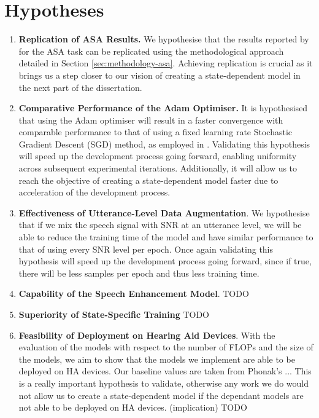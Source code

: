 \documentclass[logo,bsc,singlespacing,parskip,online]{infthesis}
\begin{document}
\section{Hypotheses}
\label{sec:hypotheses}
\begin{enumerate}
   \item \textbf{Replication of ASA Results.} 
   We hypothesise that the results reported by \citet{Huwel2020HearDS} for the ASA task can be replicated using the methodological approach detailed in Section \ref{sec:methodology-asa}.
   Achieving replication is crucial as it brings us a step closer to our vision of creating a state-dependent model in the next part of the dissertation.
   \item \textbf{Comparative Performance of the Adam Optimiser.}
   It is hypothesised that using the Adam optimiser will result in a faster convergence with comparable performance to that of using a fixed learning rate Stochastic Gradient Descent (SGD) method, as employed in \citet{Huwel2020HearDS}.
   Validating this hypothesis will speed up the development process going forward, 
   enabling uniformity across subsequent experimental iterations. Additionally,
   it will allow us to reach the objective of creating a state-dependent model faster due to acceleration of the development process.
   \item \textbf{Effectiveness of Utterance-Level Data Augmentation}. We hypothesise 
   that if we mix the speech signal with SNR at an utterance level, we will be able 
   to reduce the training time of the model and have similar performance to that of using 
   every SNR level per epoch. 
   Once again validating this hypothesis will speed up the development process going forward, 
   since if true, there will be less samples per epoch and thus less training time. 
   \item \textbf{Capability of the Speech Enhancement Model}.
   TODO
   \item \textbf{Superiority of State-Specific Training}
   TODO
   \item \textbf{Feasibility of Deployment on Hearing Aid Devices}.
   With the evaluation of the models with respect to the number of FLOPs and the size of the models,
   we aim to show that the models we implement are able to be deployed on HA devices. 
   Our baseline values are taken from Phonak's ... 
   This is a really important hypothesis to validate, otherwise any work 
   we do would not allow us to create a state-dependent model if the dependant models 
   are not able to be deployed on HA devices. (implication)
   TODO
\end{enumerate}
\end{document}
